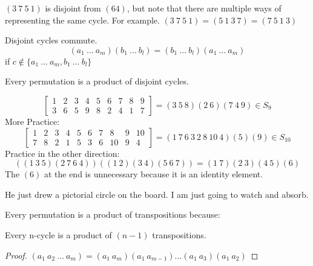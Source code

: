 \documentclass[class=scrartcl, crop=false]{standalone}
\begin{document}
\begin{example}
  $(3 \ 7 \ 5 \ 1)$ is disjoint from $(64)$, but note that there are multiple ways of representing the same cycle. \newline
  For example. $(3 \ 7 \ 5 \ 1) = (5 \ 1 \ 3 \ 7) = (7 \ 5 \ 1 \ 3)$
\end{example}

\begin{theorem}
  Disjoint cycles commute.
  $$ (a_1 \ \dots \ a_m)(b_1 \ \dots \ b_l) = (b_1 \ \dots \ b_l)(a_1 \ \dots \ a_m) $$
  if $c \notin \{a_1 \ \dots \ a_m, b_1 \ \dots \ b_l\}$
\end{theorem}

\begin{theorem}
  Every permutation is a product of disjoint cycles.
\end{theorem}

\begin{example}
  \[
    \begin{bmatrix}
      1 & 2 & 3 & 4 & 5 & 6 & 7 & 8 & 9 \\
      3 & 6 & 5 & 9 & 8 & 2 & 4 & 1 & 7 
    \end{bmatrix}
    =
    (3 \ 5 \ 8)(2 \ 6)(7 \ 4 \ 9)
    \in S_9
  \]
  More Practice:
  \[
    \begin{bmatrix}
      1 & 2 & 3 & 4 & 5 & 6 & 7 & 8 & 9 & 10 \\
      7 & 8 & 2 & 1 & 5 & 3 & 6 & 10 & 9 & 4
    \end{bmatrix}
    =
    (1 \ 7 \ 6 \ 3 \ 2 \ 8 \ 10 \ 4)(5)(9)
    \in S_{10}
  \]
  Practice in the other direction:
  \[
    ((1 \ 3 \ 5)(2 \ 7 \ 6 \ 4))((1\ 2)(3 \ 4)(5 \ 6 \ 7)) = (1 \ 7)(2 \ 3)(4 \ 5)(6)
  \]
  The $(6)$ at the end is unnecessary because it is an identity element.
\end{example}

He just drew a pictorial circle on the board. I am just going to watch and absorb.

\begin{theorem}
  Every permutation is a product of transpositions because:
  \begin{theorem}
    Every n-cycle is a product of $(n - 1)$ transpositions.
  \end{theorem}
  \begin{proof}
    $(a_1 \ a_2 \ \dots \ a_m) = (a_1 \ a_m)(a_1 \ a_{m - 1}) \dots (a_1 \ a_3)(a_1 \ a_2)$
  \end{proof}
\end{theorem}
\end{document}
